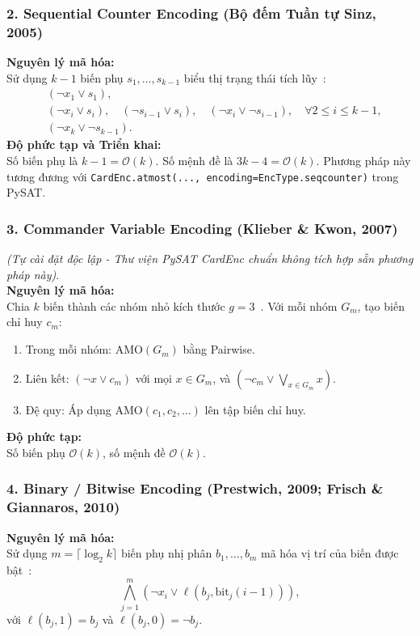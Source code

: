 \documentclass[a4paper,fleqn]{cas-sc}
\begin{document}
\subsubsection{2. Sequential Counter Encoding (Bộ đếm Tuần tự Sinz, 2005)}
\textbf{Nguyên lý mã hóa:}\\
Sử dụng $k-1$ biến phụ $s_1, \dots, s_{k-1}$ biểu thị trạng thái tích lũy~\cite{sinz2005towards}:
\begin{align}
    &(\neg x_1 \lor s_1), \\
    &(\neg x_i \lor s_i), \quad (\neg s_{i-1} \lor s_i), \quad (\neg x_i \lor \neg s_{i-1}), \quad \forall 2 \le i \le k-1, \\
    &(\neg x_k \lor \neg s_{k-1}).
\end{align}
\textbf{Độ phức tạp và Triển khai:}\\
Số biến phụ là $k - 1 = \mathcal{O}(k)$. Số mệnh đề là $3k - 4 = \mathcal{O}(k)$. Phương pháp này tương đương với \texttt{CardEnc.atmost(..., encoding=EncType.seqcounter)} trong PySAT.

\subsubsection{3. Commander Variable Encoding (Klieber \& Kwon, 2007)}
\textit{(Tự cài đặt độc lập - Thư viện PySAT CardEnc chuẩn không tích hợp sẵn phương pháp này)}.\\
\textbf{Nguyên lý mã hóa:}\\
Chia $k$ biến thành các nhóm nhỏ kích thước $g=3$~\cite{klieber2007efficient}. Với mỗi nhóm $G_m$, tạo biến chỉ huy $c_m$:
\begin{enumerate}
    \item Trong mỗi nhóm: $\text{AMO}(G_m)$ bằng Pairwise.
    \item Liên kết: $(\neg x \lor c_m)$ với mọi $x \in G_m$, và $(\neg c_m \lor \bigvee_{x \in G_m} x)$.
    \item Đệ quy: Áp dụng $\text{AMO}(c_1, c_2, \dots)$ lên tập biến chỉ huy.
\end{enumerate}
\textbf{Độ phức tạp:}\\
Số biến phụ $\mathcal{O}(k)$, số mệnh đề $\mathcal{O}(k)$.

\subsubsection{4. Binary / Bitwise Encoding (Prestwich, 2009; Frisch \& Giannaros, 2010)}
\textbf{Nguyên lý mã hóa:}\\
Sử dụng $m = \lceil \log_2 k \rceil$ biến phụ nhị phân $b_1, \dots, b_m$ mã hóa vị trí của biến được bật~\cite{prestwich2009cnf,frisch2010sat}:
\begin{equation}
    \bigwedge_{j=1}^m (\neg x_i \lor \ell(b_j, \text{bit}_j(i-1))),
\end{equation}
với $\ell(b_j, 1) = b_j$ và $\ell(b_j, 0) = \neg b_j$.
\end{document}
